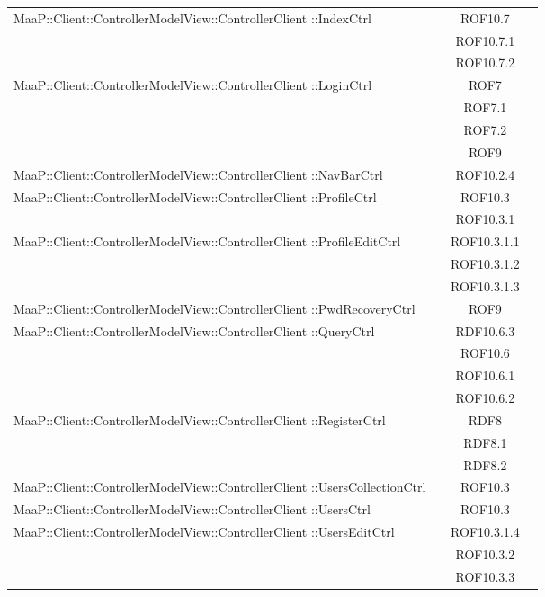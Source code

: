 \begin{center}
\begin{longtable}{|p{0.8\linewidth}|c|}
\midrule
MaaP::Client::ControllerModelView::ControllerClient ::IndexCtrl
& ROF10.7\\
& ROF10.7.1\\
& ROF10.7.2\\

\midrule
MaaP::Client::ControllerModelView::ControllerClient ::LoginCtrl
& ROF7\\
& ROF7.1\\
& ROF7.2\\
& ROF9\\

\midrule
MaaP::Client::ControllerModelView::ControllerClient ::NavBarCtrl
& ROF10.2.4\\

\midrule
MaaP::Client::ControllerModelView::ControllerClient ::ProfileCtrl
& ROF10.3\\
& ROF10.3.1\\

\midrule
MaaP::Client::ControllerModelView::ControllerClient ::ProfileEditCtrl
& ROF10.3.1.1\\
& ROF10.3.1.2\\
& ROF10.3.1.3\\

\midrule
MaaP::Client::ControllerModelView::ControllerClient ::PwdRecoveryCtrl
& ROF9\\

\midrule
MaaP::Client::ControllerModelView::ControllerClient ::QueryCtrl
& RDF10.6.3\\
& ROF10.6\\
& ROF10.6.1\\
& ROF10.6.2\\

\midrule
MaaP::Client::ControllerModelView::ControllerClient ::RegisterCtrl
& RDF8\\
& RDF8.1\\
& RDF8.2\\

\midrule
MaaP::Client::ControllerModelView::ControllerClient ::UsersCollectionCtrl
& ROF10.3\\

\midrule
MaaP::Client::ControllerModelView::ControllerClient ::UsersCtrl
& ROF10.3\\

\midrule
MaaP::Client::ControllerModelView::ControllerClient ::UsersEditCtrl
& ROF10.3.1.4\\
& ROF10.3.2\\
& ROF10.3.3\\


\end{longtable}
\end{center}

